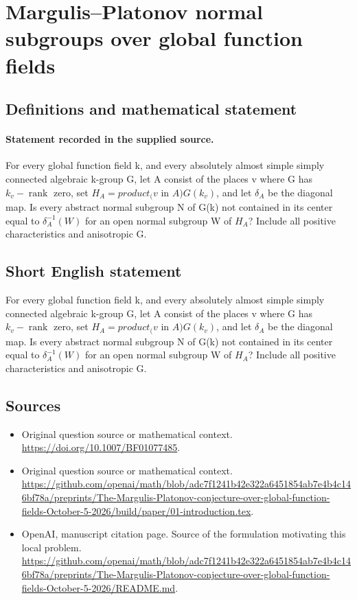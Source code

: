 \documentclass[11pt]{article}
\begin{document}
\section*{Margulis–Platonov normal subgroups over global function fields}\label{30007292}
\subsection{Definitions and mathematical statement}
\paragraph{Statement recorded in the supplied source.}
For every global function field k, and every absolutely almost simple simply connected algebraic k-group G, let A consist of the places v where G has $k_v-\operatorname{rank}$ zero, set $H_A=product_(v$ in $A)G(k_v)$, and let $\delta _A$ be the diagonal map. Is every abstract normal subgroup N of G(k) not contained in its center equal to $\delta _A^{-1}(W)$ for an open normal subgroup W of $H_A$? Include all positive characteristics and anisotropic G.
\subsection{Short English statement}
For every global function field k, and every absolutely almost simple simply connected algebraic k-group G, let A consist of the places v where G has $k_v-\operatorname{rank}$ zero, set $H_A=product_(v$ in $A)G(k_v)$, and let $\delta _A$ be the diagonal map. Is every abstract normal subgroup N of G(k) not contained in its center equal to $\delta _A^{-1}(W)$ for an open normal subgroup W of $H_A$? Include all positive characteristics and anisotropic G.
\subsection{Sources}
\begin{itemize}
\item[S1] Original question source or mathematical context.
\url{https://doi.org/10.1007/BF01077485}.
\item[S2] Original question source or mathematical context.
\url{https://github.com/openai/math/blob/adc7f1241b42e322a6451854ab7e4b4c146bf78a/preprints/The-Margulis-Platonov-conjecture-over-global-function-fields-October-5-2026/build/paper/01-introduction.tex}.
\item[S3] OpenAI, manuscript citation page. Source of the formulation motivating this local problem.
\url{https://github.com/openai/math/blob/adc7f1241b42e322a6451854ab7e4b4c146bf78a/preprints/The-Margulis-Platonov-conjecture-over-global-function-fields-October-5-2026/README.md}.
\end{itemize}
\end{document}
